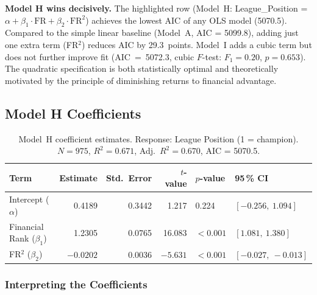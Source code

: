 \documentclass[11pt, a4paper]{article}
\begin{document}
\begin{findingbox}
  \textbf{Model H wins decisively.} The highlighted row (Model~H: League\_Position
  = $\alpha + \beta_1 \cdot \text{FR} + \beta_2 \cdot \text{FR}^2$) achieves the
  lowest AIC of any OLS model (5070.5). Compared to the simple linear baseline
  (Model~A, AIC = 5099.8), adding just one extra term (FR$^2$) reduces AIC by
  29.3~points. Model~I adds a cubic term but does not further improve fit
  (AIC~=~5072.3, cubic $F$-test: $F_{1} = 0.20$, $p = 0.653$). The quadratic
  specification is both statistically optimal and theoretically motivated by the
  principle of diminishing returns to financial advantage.
\end{findingbox}

\subsection{Model H Coefficients}

\begin{table}[H]
  \centering
  \small
  \caption{Model~H coefficient estimates. Response: League Position (1 = champion).
    $N = 975$, $R^{2} = 0.671$, Adj.~$R^{2} = 0.670$, AIC = 5070.5.}
  \label{tab:modelHcoefs}
  \begin{tabular}{l r r r l p{4.0cm}}
    \toprule
    \rowcolor{NavyBlue}
    \color{white}\textbf{Term} &
    \color{white}\textbf{Estimate} &
    \color{white}\textbf{Std.\ Error} &
    \color{white}\textbf{$t$-value} &
    \color{white}\textbf{$p$-value} &
    \color{white}\textbf{95\,\% CI} \\
    \midrule
    Intercept ($\alpha$)        & 0.4189  & 0.3442 &  1.217 & 0.224 & $[-0.256,\ 1.094]$ \\
    \rowcolor{RowA}
    Financial Rank ($\beta_1$)  & 1.2305  & 0.0765 & 16.083 & $< 0.001$ & $[1.081,\ 1.380]$ \\
    FR$^{2}$ ($\beta_2$)        & $-0.0202$ & 0.0036 & $-5.631$ & $< 0.001$ & $[-0.027,\ -0.013]$ \\
    \bottomrule
  \end{tabular}
\end{table}

\subsubsection{Interpreting the Coefficients}
\end{document}

